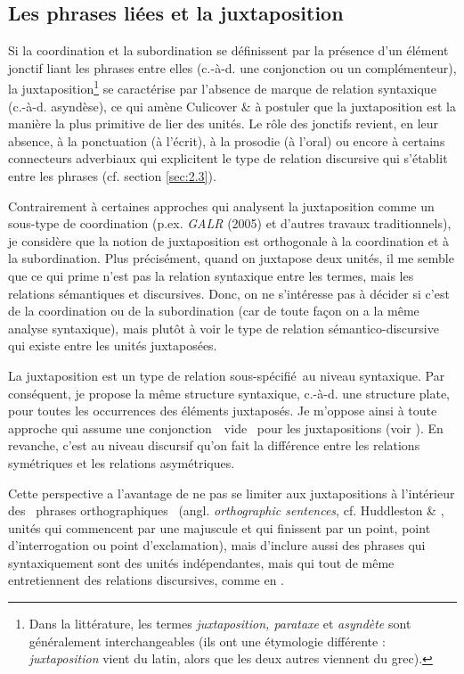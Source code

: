 \subsection{Les phrases liées et la juxtaposition} 
\label{bkm:Ref301448824}\label{bkm:Ref302035340}Si la coordination et la subordination se définissent par la présence d'un élément jonctif liant les phrases entre elles (c.-à-d. une conjonction ou un complémenteur), la juxtaposition\footnote{Dans la littérature, les termes \textit{juxtaposition, parataxe} et \textit{asyndète} sont généralement interchangeables (ils ont une étymologie différente : \textit{juxtaposition} vient du latin, alors que les deux autres viennent du grec).}  se caractérise par l'absence de marque de relation syntaxique (c.-à-d. asyndèse), ce qui amène Culicover \& \citet[528]{Jackendoff2005} à postuler que la juxtaposition est la manière la plus primitive de lier des unités. Le rôle des jonctifs revient, en leur absence, à la ponctuation (à l'écrit), à la prosodie (à l'oral) ou encore à certains connecteurs adverbiaux qui explicitent le type de relation discursive qui s'établit entre les phrases (cf. section \ref{sec:2.3}). 

Contrairement à certaines approches qui analysent la juxtaposition comme un sous-type de coordination (p.ex. \textit{GALR} (2005) et d'autres travaux traditionnels), je considère que la notion de juxtaposition est orthogonale à la coordination et à la subordination. Plus précisément, quand on juxtapose deux unités, il me semble que ce qui prime n'est pas la relation syntaxique entre les termes, mais les relations sémantiques et discursives. Donc, on ne s'intéresse pas à décider si c'est de la coordination ou de la subordination (car de toute façon on a la même analyse syntaxique), mais plutôt à voir le type de relation sémantico-discursive qui existe entre les unités juxtaposées.

La juxtaposition est un type de relation sous-spécifié~au niveau syntaxique. Par conséquent, je propose la même structure syntaxique, c.-à-d. une structure plate, pour toutes les occurrences des éléments juxtaposés. Je m'oppose ainsi à toute approche qui assume une conjonction~{\guillemotleft}~vide~{\guillemotright} pour les juxtapositions (voir \citet[84]{Johannessen1998}). En revanche, c'est au niveau discursif qu'on fait la différence entre les relations symétriques et les relations asymétriques.

Cette perspective a l'avantage de ne pas se limiter aux juxtapositions à l'intérieur des {\guillemotleft}~phrases orthographiques~{\guillemotright} (angl. \textit{orthographic sentences}, cf. Huddleston \& \citet[1728]{Pullum2002}, unités qui commencent par une majuscule et qui finissent par un point, point d'interrogation ou point d'exclamation), mais d'inclure aussi des phrases qui syntaxiquement sont des unités indépendantes, mais qui tout de même entretiennent des relations discursives, comme en .


